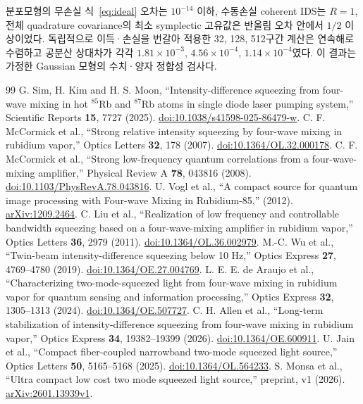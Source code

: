 \documentclass[11pt,a4paper]{article}
\begin{document}
분포모형의 무손실 식~\eqref{eq:ideal} 오차는 $10^{-14}$ 이하,
수동손실 coherent IDS는 $R=1$, 전체 quadrature covariance의 최소
symplectic 고유값은 반올림 오차 안에서 $1/2$ 이상이었다.
독립적으로 이득·손실을 번갈아 적용한 32, 128, 512구간 계산은 연속해로
수렴하고 공분산 상대차가 각각 $1.81\times10^{-3}$,
$4.56\times10^{-4}$, $1.14\times10^{-4}$였다.
이 결과는 가정한 Gaussian 모형의 수치·양자 정합성 검사다.

\begin{thebibliography}{99}\small
{} G. Sim, H. Kim and H. S. Moon, ``Intensity-difference squeezing from four-wave mixing
in hot $^{85}$Rb and $^{87}$Rb atoms in single diode laser pumping system,''
Scientific Reports \textbf{15}, 7727 (2025).
\href{https://doi.org/10.1038/s41598-025-86479-w}{doi:10.1038/s41598-025-86479-w}.
 C. F. McCormick et al., ``Strong relative intensity squeezing
by four-wave mixing in rubidium vapor,'' Optics Letters \textbf{32}, 178 (2007).
\href{https://doi.org/10.1364/OL.32.000178}{doi:10.1364/OL.32.000178}.
 C. F. McCormick et al., ``Strong low-frequency quantum correlations
from a four-wave-mixing amplifier,'' Physical Review A \textbf{78}, 043816 (2008).
\href{https://doi.org/10.1103/PhysRevA.78.043816}{doi:10.1103/PhysRevA.78.043816}.
 U. Vogl et al., ``A compact source for quantum image processing
with Four-wave Mixing in Rubidium-85,'' (2012).
\href{https://arxiv.org/abs/1209.2464}{arXiv:1209.2464}.
 C. Liu et al., ``Realization of low frequency and controllable
bandwidth squeezing based on a four-wave-mixing amplifier in rubidium vapor,''
Optics Letters \textbf{36}, 2979 (2011).
\href{https://doi.org/10.1364/OL.36.002979}{doi:10.1364/OL.36.002979}.
 M.-C. Wu et al., ``Twin-beam intensity-difference squeezing below
10 Hz,'' Optics Express \textbf{27}, 4769--4780 (2019).
\href{https://doi.org/10.1364/OE.27.004769}{doi:10.1364/OE.27.004769}.
 L. E. E. de Araujo et al., ``Characterizing two-mode-squeezed
light from four-wave mixing in rubidium vapor for quantum sensing and information
processing,'' Optics Express \textbf{32}, 1305--1313 (2024).
\href{https://doi.org/10.1364/OE.507727}{doi:10.1364/OE.507727}.
 C. H. Allen et al., ``Long-term stabilization of intensity-difference
squeezing from four-wave mixing in rubidium vapor,'' Optics Express \textbf{34}, 19382--19399 (2026).
\href{https://doi.org/10.1364/OE.600911}{doi:10.1364/OE.600911}.
 U. Jain et al., ``Compact fiber-coupled narrowband two-mode
squeezed light source,'' Optics Letters \textbf{50}, 5165--5168 (2025).
\href{https://doi.org/10.1364/OL.564233}{doi:10.1364/OL.564233}.
 S. Monsa et al., ``Ultra compact low cost two mode squeezed light
source,'' preprint, v1 (2026).
\href{https://arxiv.org/abs/2601.13939v1}{arXiv:2601.13939v1}.
\end{thebibliography}
\end{document}
